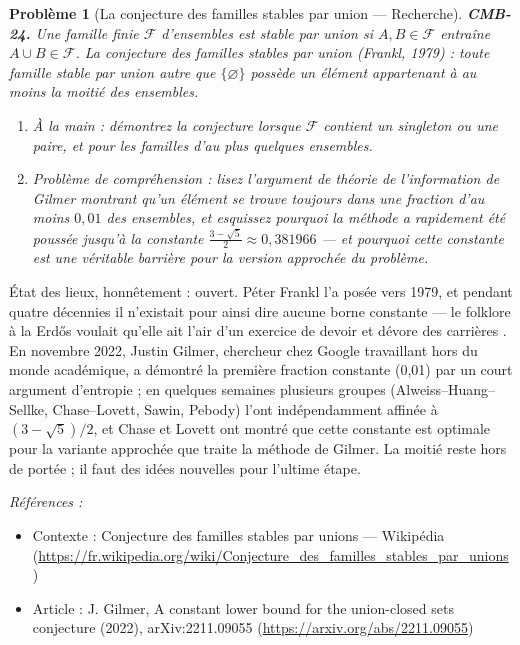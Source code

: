 \documentclass[11pt]{article}
\newtheorem{problem}{Problème}
\newenvironment{refs}{\par\small\noindent\emph{Références :}\begin{itemize}\setlength\itemsep{0pt}}{\end{itemize}\normalsize}
\begin{document}
\bigskip

\begin{problem}[{La conjecture des familles stables par union --- Recherche}]
\textbf{CMB-24.} Une famille finie $ \mathcal{F} $ d'ensembles est stable par union si
$ A, B \in \mathcal{F} $ entraîne $ A \cup B \in \mathcal{F} $. La conjecture des familles
stables par union (Frankl, 1979) : toute famille stable par union autre que
$ \{\varnothing\} $ possède un élément appartenant à au moins la moitié des ensembles.
\begin{enumerate}
\item[(a)] À la main : démontrez la conjecture lorsque $ \mathcal{F} $ contient un singleton ou une
paire, et pour les familles d'au plus quelques ensembles.
\item[(b)] Problème de compréhension : lisez l'argument de théorie de l'information de Gilmer montrant
qu'un élément se trouve toujours dans une fraction d'au moins $ 0{,}01 $ des ensembles, et
esquissez pourquoi la méthode a rapidement été poussée jusqu'à la constante
$ \frac{3 - \sqrt{5}}{2} \approx 0{,}381966 $ --- et pourquoi cette constante est une véritable
barrière pour la version approchée du problème.
\end{enumerate}

\end{problem}

\noindent État des lieux, honnêtement : ouvert. Péter Frankl l'a posée vers 1979, et
pendant quatre décennies il n'existait pour ainsi dire aucune borne constante --- le folklore à la
Erd\H{o}s voulait qu'elle \og{} ait l'air d'un exercice de devoir et dévore des carrières \fg{}. En novembre
2022, Justin Gilmer, chercheur chez Google travaillant hors du monde académique, a démontré la
première fraction constante (0,01) par un court argument d'entropie ; en quelques semaines
plusieurs groupes (Alweiss--Huang--Sellke, Chase--Lovett, Sawin, Pebody) l'ont indépendamment affinée
à $ (3-\sqrt{5})/2 $, et Chase et Lovett ont montré que cette constante est optimale pour la
variante approchée que traite la méthode de Gilmer. La moitié reste hors de portée ; il faut des
idées nouvelles pour l'ultime étape.

\begin{refs}
\item Contexte : Conjecture des familles stables par unions --- Wikipédia (\url{https://fr.wikipedia.org/wiki/Conjecture_des_familles_stables_par_unions})
\item Article : J. Gilmer, \og{} A constant lower bound for the union-closed sets conjecture \fg{} (2022), arXiv:2211.09055 (\url{https://arxiv.org/abs/2211.09055})
\end{refs}
\end{document}
